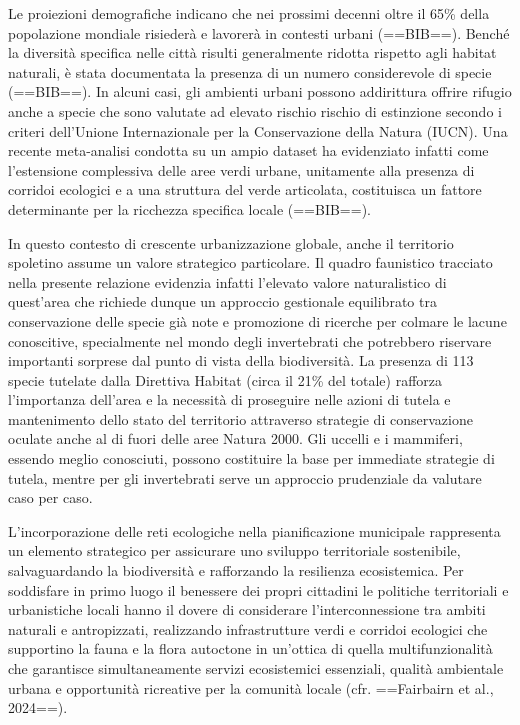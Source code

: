 \documentclass[
]{book}
\begin{document}
Le proiezioni demografiche indicano che nei prossimi decenni oltre il 65\% della popolazione mondiale risiederà e lavorerà in contesti urbani (==BIB==). Benché la diversità specifica nelle città risulti generalmente ridotta rispetto agli habitat naturali, è stata documentata la presenza di un numero considerevole di specie (==BIB==). In alcuni casi, gli ambienti urbani possono addirittura offrire rifugio anche a specie che sono valutate ad elevato rischio rischio di estinzione secondo i criteri dell'Unione Internazionale per la Conservazione della Natura (IUCN). Una recente meta-analisi condotta su un ampio dataset ha evidenziato infatti come l'estensione complessiva delle aree verdi urbane, unitamente alla presenza di corridoi ecologici e a una struttura del verde articolata, costituisca un fattore determinante per la ricchezza specifica locale (==BIB==).

In questo contesto di crescente urbanizzazione globale, anche il territorio spoletino assume un valore strategico particolare. Il quadro faunistico tracciato nella presente relazione evidenzia infatti l'elevato valore naturalistico di quest'area che richiede dunque un approccio gestionale equilibrato tra conservazione delle specie già note e promozione di ricerche per colmare le lacune conoscitive, specialmente nel mondo degli invertebrati che potrebbero riservare importanti sorprese dal punto di vista della biodiversità. La presenza di 113 specie tutelate dalla Direttiva Habitat (circa il 21\% del totale) rafforza l'importanza dell'area e la necessità di proseguire nelle azioni di tutela e mantenimento dello stato del territorio attraverso strategie di conservazione oculate anche al di fuori delle aree Natura 2000. Gli uccelli e i mammiferi, essendo meglio conosciuti, possono costituire la base per immediate strategie di tutela, mentre per gli invertebrati serve un approccio prudenziale da valutare caso per caso.

L'incorporazione delle reti ecologiche nella pianificazione municipale rappresenta un elemento strategico per assicurare uno sviluppo territoriale sostenibile, salvaguardando la biodiversità e rafforzando la resilienza ecosistemica. Per soddisfare in primo luogo il benessere dei propri cittadini le politiche territoriali e urbanistiche locali hanno il dovere di considerare l'interconnessione tra ambiti naturali e antropizzati, realizzando infrastrutture verdi e corridoi ecologici che supportino la fauna e la flora autoctone in un'ottica di quella multifunzionalità che garantisce simultaneamente servizi ecosistemici essenziali, qualità ambientale urbana e opportunità ricreative per la comunità locale (cfr. ==Fairbairn et al., 2024==).
\end{document}
